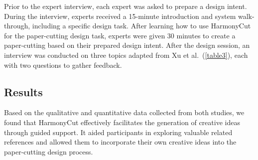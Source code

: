 Prior to the expert interview, each expert was asked to prepare a design intent. During the interview, experts received a 15-minute introduction and system walk-through, including a specific design task. After learning how to use HarmonyCut for the paper-cutting design task, experts were given 30 minutes to create a paper-cutting based on their prepared design intent. After the design session, an interview was conducted on three topics adapted from Xu et al.\cite{Xu:2023:magicalbrush}~(\autoref{table3}), each with two questions to gather feedback.
\begin{table}[!htbp]
\caption{Questions during expert interviews from 3 topics.}
\label{table3}
\end{table}

\subsection{Results}
Based on the qualitative and quantitative data collected from both studies, we found that HarmonyCut effectively facilitates the generation of creative ideas through guided support. It aided participants in exploring valuable related references and allowed them to incorporate their own creative ideas into the paper-cutting design process. 

